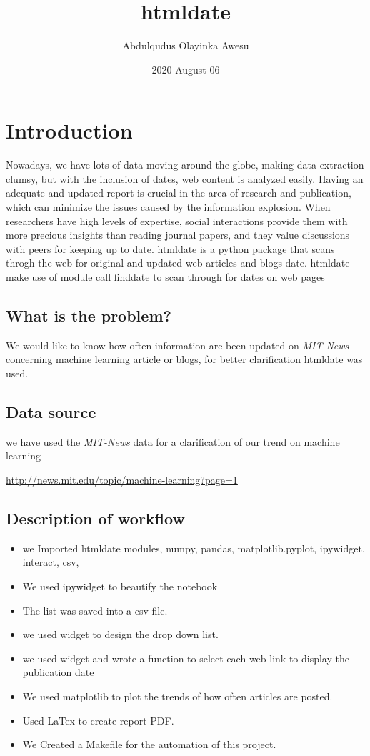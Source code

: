 \documentclass[12pt, letterpaper, twoside]{report}
\title{\textbf{htmldate}}
\author{Abdulqudus Olayinka Awesu}
\date{2020 August 06}
\begin{document}
\maketitle

  

\chapter{Introduction}
Nowadays, we have lots of data moving around the globe, making data extraction clumsy, but with the inclusion of dates, web content is analyzed easily. Having an adequate and updated report is crucial in the area of research and publication, which can minimize the issues caused by the information explosion. When researchers have high levels of expertise, social interactions provide them with more precious insights than reading journal papers, and they value discussions with peers for keeping up to date. htmldate is a python package that scans throgh the web for original and updated web articles and blogs date. htmldate make use of module call finddate to scan through for dates on web pages 

\section{What is the problem?}
We would like to know how often information are been updated on \textit{MIT-News} concerning machine learning article or blogs, for better clarification htmldate was used.  

\section{Data source}
we have used the \textit{MIT-News} data for a clarification of our trend on machine learning  

 \url{http://news.mit.edu/topic/machine-learning?page=1}

\section{Description of workflow}
\begin{itemize}
  \item we Imported htmldate modules, numpy, pandas, matplotlib.pyplot, ipywidget, interact, csv,
  \item We used ipywidget to beautify the notebook 
  \item The list was saved into a csv file.
  \item we used widget to design the drop down list.
  \item we used widget and wrote a function to select each web link to display the publication date
  \item We used matplotlib to plot the trends of how often articles are posted.
  \item Used LaTex to create report PDF.
  \item We Created a Makefile for the automation of this project.
\end{itemize}
\end{document}
